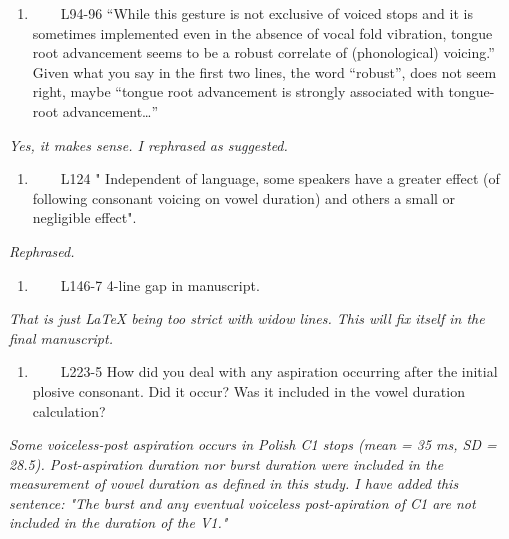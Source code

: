 \documentclass[]{article}
\providecommand{\tightlist}{%
  \setlength{\itemsep}{0pt}\setlength{\parskip}{0pt}}
\begin{document}
\begin{enumerate}
\def\labelenumi{\arabic{enumi}.}
\setcounter{enumi}{2}
\tightlist
\item
  ~~~~L94-96 ``While this gesture is not exclusive of voiced stops and
  it is sometimes implemented even in the absence of vocal fold
  vibration, tongue root advancement seems to be a robust correlate of
  (phonological) voicing.'' Given what you say in the first two lines,
  the word ``robust'', does not seem right, maybe ``tongue root
  advancement is strongly associated with tongue-root
  advancement\ldots{}''
\end{enumerate}

\begin{adjustwidth}{1cm}{} \textit{
Yes, it makes sense. I rephrased as suggested.
} \end{adjustwidth}

\begin{enumerate}
\def\labelenumi{\arabic{enumi}.}
\setcounter{enumi}{3}
\tightlist
\item
  ~~~~L124 " Independent of language, some speakers have a greater
  effect (of following consonant voicing on vowel duration) and others a
  small or negligible effect".
\end{enumerate}

\begin{adjustwidth}{1cm}{} \textit{
Rephrased.
} \end{adjustwidth}

\begin{enumerate}
\def\labelenumi{\arabic{enumi}.}
\setcounter{enumi}{4}
\tightlist
\item
  ~~~~L146-7 4-line gap in manuscript.
\end{enumerate}

\begin{adjustwidth}{1cm}{} \textit{
That is just LaTeX being too strict with widow lines. This will fix itself in the final manuscript.
} \end{adjustwidth}

\begin{enumerate}
\def\labelenumi{\arabic{enumi}.}
\setcounter{enumi}{5}
\tightlist
\item
  ~~~~L223-5 How did you deal with any aspiration occurring after the
  initial plosive consonant. Did it occur? Was it included in the vowel
  duration calculation?
\end{enumerate}

\begin{adjustwidth}{1cm}{} \textit{
Some voiceless-post aspiration occurs in Polish C1 stops (mean = 35 ms, SD = 28.5).
Post-aspiration duration nor burst duration were included in the measurement of vowel duration as defined in this study.
I have added this sentence: "The burst and any eventual voiceless post-apiration of C1 are not included in the duration of the V1."
} \end{adjustwidth}
\end{document}
